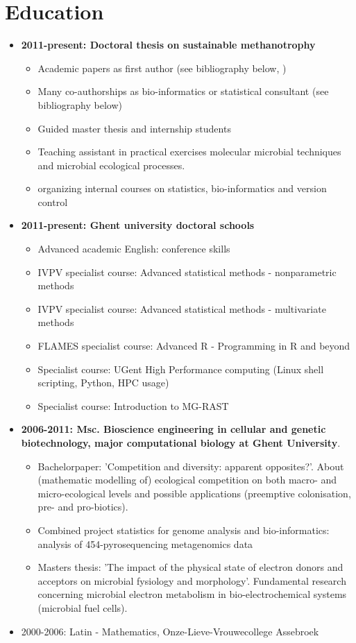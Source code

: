 \documentclass[a4paper,11pt,oneside]{article}
\begin{document}
\section*{Education}
\begin{itemize}
\item \textbf{2011-present: Doctoral thesis on sustainable methanotrophy}
    \begin{itemize}
      \item Academic papers as first author (see bibliography below, \cite{kerckhof2014optimized})
      \item Many co-authorships as bio-informatics or statistical consultant  (see bibliography below)
      \item Guided master thesis and internship students
      \item Teaching assistant in practical exercises molecular microbial techniques and microbial ecological processes.
      \item organizing internal courses on statistics, bio-informatics and version control
    \end{itemize}
\item \textbf{2011-present: Ghent university doctoral schools}
    \begin{itemize}
      \item Advanced academic English: conference skills
      \item IVPV specialist course: Advanced statistical methods - nonparametric methods
      \item IVPV specialist course: Advanced statistical methods - multivariate methods
      \item FLAMES specialist course: Advanced R - Programming in R and beyond
      \item Specialist course: UGent High Performance computing (Linux shell scripting, Python, HPC usage)
      \item Specialist course: Introduction to MG-RAST
    \end{itemize}
\item \textbf{2006-2011: Msc. Bioscience engineering in cellular and genetic biotechnology, major computational biology at Ghent University}. 
	\begin{itemize}
		\item Bachelorpaper: 'Competition and diversity: apparent opposites?'. About (mathematic modelling of) ecological competition on both macro- and micro-ecological levels and possible applications (preemptive colonisation, pre- and pro-biotics).
		\item Combined project statistics for genome analysis and bio-informatics: analysis of 454-pyrosequencing metagenomics data
		\item Masters thesis: 'The impact of the physical state of electron donors and acceptors on microbial fysiology and morphology'. Fundamental research concerning microbial electron metabolism in bio-electrochemical systems (microbial fuel cells).
	\end{itemize}
\item 2000-2006: Latin - Mathematics, Onze-Lieve-Vrouwecollege Assebroek
\end{itemize}
\end{document}
